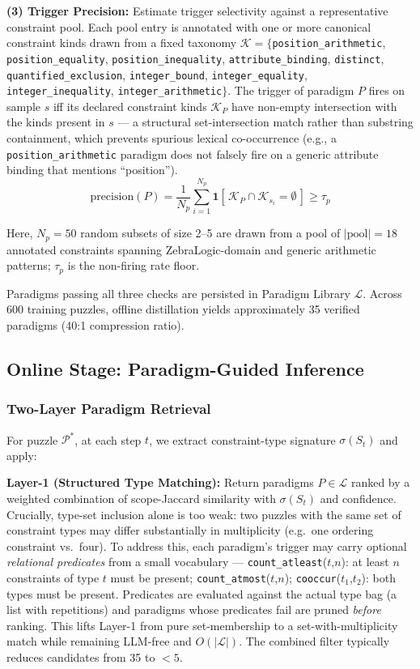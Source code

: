 \textbf{(3) Trigger Precision:} Estimate trigger selectivity against a representative constraint pool. Each pool entry is annotated with one or more canonical constraint kinds drawn from a fixed taxonomy $\mathcal{K} = \{$\texttt{position\_arithmetic}, \texttt{position\_equality}, \texttt{position\_inequality}, \texttt{attribute\_binding}, \texttt{distinct}, \texttt{quantified\_exclusion}, \texttt{integer\_bound}, \texttt{integer\_equality}, \texttt{integer\_inequality}, \texttt{integer\_arithmetic}$\}$. The trigger of paradigm $P$ fires on sample $s$ iff its declared constraint kinds $\mathcal{K}_P$ have non-empty intersection with the kinds present in $s$ —
a structural set-intersection match rather than substring containment, which prevents spurious lexical co-occurrence (e.g., a \texttt{position\_arithmetic} paradigm does not falsely fire on a generic attribute binding that mentions ``position'').
\[
\text{precision}(P) =
\frac{1}{N_p} \sum_{i=1}^{N_p} \mathbf{1}[\,\mathcal{K}_P \cap \mathcal{K}_{s_i} = \emptyset\,]
\geq \tau_p
\]

Here, $N_p = 50$ random subsets of size 2--5 are drawn from a pool of $|\text{pool}| = 18$ annotated constraints spanning ZebraLogic-domain and generic arithmetic patterns; $\tau_p$ is the non-firing rate floor.

Paradigms passing all three checks are persisted in Paradigm Library $\mathcal{L}$. Across 600 training puzzles, offline distillation yields approximately 35 verified paradigms (40:1 compression ratio).

\subsection{Online Stage: Paradigm-Guided Inference}

\subsubsection{Two-Layer Paradigm Retrieval}

For puzzle $\mathcal{P}^*$, at each step $t$, we extract constraint-type signature $\sigma(S_t)$ and apply:

\textbf{Layer-1 (Structured Type Matching):} Return paradigms $P \in \mathcal{L}$ ranked by a weighted combination of scope-Jaccard similarity with $\sigma(S_t)$ and confidence. Crucially, type-set inclusion alone is too weak: two puzzles with the same set of constraint types may differ substantially in multiplicity (e.g.\ one ordering constraint vs.\ four). To address this, each paradigm's trigger may carry optional \emph{relational predicates} from a small vocabulary --- \texttt{count\_atleast}($t$,$n$): at least $n$ constraints of type $t$ must be present; \texttt{count\_atmost}($t$,$n$); \texttt{cooccur}($t_1$,$t_2$): both types must be present. Predicates are evaluated against the actual type bag (a list with repetitions) and paradigms whose predicates fail are pruned \emph{before} ranking. This lifts Layer-1 from pure set-membership to a set-with-multiplicity match while remaining LLM-free and $O(|\mathcal{L}|)$. The combined filter typically reduces candidates from 35 to $< 5$.

